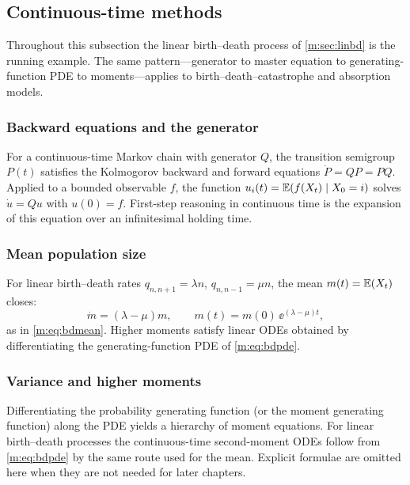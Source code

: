 \subsection{Continuous-time methods}
\label{m:sec:ct-methods}

Throughout this subsection the linear birth--death process of \cref{m:sec:linbd} is
the running example. The same pattern---generator to master equation to
generating-function PDE to moments---applies to birth--death--catastrophe and
absorption models.

\subsubsection*{Backward equations and the generator}

For a continuous-time Markov chain with generator $Q$, the transition semigroup
$P(t)$ satisfies the Kolmogorov backward and forward equations
$\dot P = QP = PQ$. Applied to a bounded observable $f$, the function
$u_i(t)=\mathbb{E}\!\left(f(X_t)\mid X_0=i\right)$ solves $\dot u = Qu$ with $u(0)=f$. First-step
reasoning in continuous time is the expansion of this equation over an infinitesimal
holding time.

\subsubsection*{Mean population size}

For linear birth--death rates $q_{n,n+1}=\lambda n$, $q_{n,n-1}=\mu n$, the mean
$m(t)=\mathbb{E}\!\left(X_t\right)$ closes:
\begin{equation}
\label{m:eq:bdmean-method}
\dot m = (\lambda-\mu)m,
\qquad m(t)=m(0)\,\ee^{(\lambda-\mu)t},
\end{equation}
as in \cref{m:eq:bdmean}. Higher moments satisfy linear ODEs obtained by
differentiating the generating-function PDE of \cref{m:eq:bdpde}.

\subsubsection*{Variance and higher moments}

Differentiating the probability generating function (or the moment generating
function) along the PDE yields a hierarchy of moment equations. For linear
birth--death processes the continuous-time second-moment ODEs follow from
\cref{m:eq:bdpde} by the same route used for the mean. Explicit formulae are
omitted here when they are not needed for later chapters.

